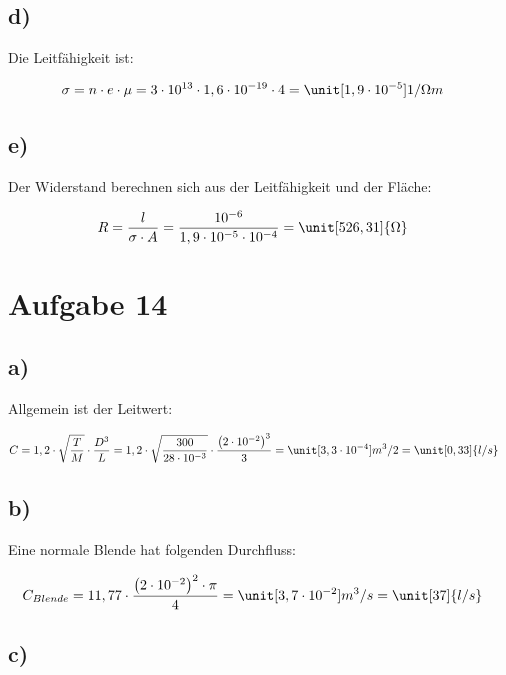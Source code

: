 \subsection*{d)}


Die Leitfähigkeit ist:

\begin{align*}
\sigma &= n \cdot e \cdot \mu = 3 \cdot 10^{13} \cdot 1,6 \cdot 10^{-19} \cdot 4 = \unit[1,9 \cdot 10^{-5}]{1/ \Omega m}
\end{align*}


\subsection*{e)}

Der Widerstand berechnen sich aus der Leitfähigkeit und der Fläche:

\begin{align*}
R &= \frac{l}{\sigma \cdot A} = \frac{10^{-6}}{1,9 \cdot 10^{-5} \cdot 10^{-4}} = \unit[526,31]{\Omega}
\end{align*}


\section{Aufgabe 14}

\subsection*{a)}

Allgemein ist der Leitwert:

\begin{align*}
C &= 1,2 \cdot \sqrt{\frac{T}{M}} \cdot \frac{D^3}{L} = 1,2 \cdot \sqrt{\frac{300}{28 \cdot 10^{-3}}} \cdot \frac{\left( 2 \cdot 10^{-2} \right)^3}{3} = \unit[3,3 \cdot 10^{-4}]{m^3/2} = \unit[0,33]{l/s}
\end{align*}

\subsection*{b)}

Eine normale Blende hat folgenden Durchfluss:

\begin{align*}
C_{Blende} &= 11,77 \cdot \frac{\left( 2 \cdot 10^{-2} \right)^2 \cdot \pi}{4} = \unit[3,7 \cdot 10^{-2}]{m^3/s} = \unit[37]{l/s}
\end{align*}

\subsection*{c)}

